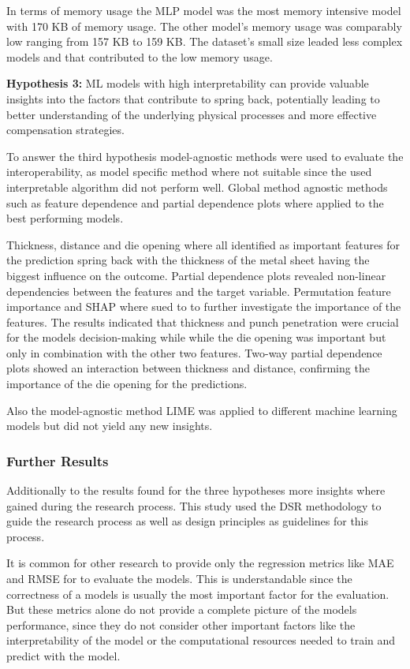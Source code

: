 In terms of memory usage the MLP model was the most memory intensive model with 170 KB of memory usage.
The other model's memory usage was comparably low ranging from 157 KB to 159 KB.
The dataset's small size leaded less complex models and that contributed to the low memory usage.

\textbf{Hypothesis 3:} ML models with high interpretability can provide valuable insights into the factors that
contribute to spring back, potentially leading to better understanding of the underlying physical processes and
more effective compensation strategies.

To answer the third hypothesis model-agnostic methods were used to evaluate the interoperability, as model specific
method where not suitable since the used interpretable algorithm did not perform well.
Global method agnostic methods such as feature dependence and partial dependence plots where applied to the best
performing models.

Thickness, distance and die opening where all identified as important features for the prediction spring back with the
thickness of the metal sheet having the biggest influence on the outcome.
Partial dependence plots revealed non-linear dependencies between the features and the target variable.
Permutation feature importance and SHAP where sued to to further investigate the importance of the features.
The results indicated that thickness and punch penetration were crucial for the models decision-making while while the
die opening was important but only in combination with the other two features.
Two-way partial dependence plots showed an interaction between thickness and distance, confirming the importance of the
die opening for the predictions.

Also the model-agnostic method LIME was applied to different machine learning models but did not yield any new insights.

\subsubsection*{Further Results}
Additionally to the results found for the three hypotheses more insights where gained during the research process.
This study used the \ac{DSR} methodology to guide the research process as well as design principles as guidelines for
this process.

It is common for other research to provide only the regression metrics like MAE and RMSE for to evaluate the models.
This is understandable since the correctness of a models is usually the most important factor for the evaluation.
But these metrics alone do not provide a complete picture of the models performance, since they do not consider
other important factors like the interpretability of the model or the computational resources needed to train and
predict with the model.

